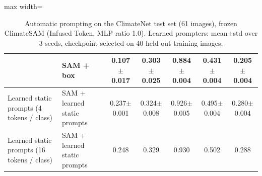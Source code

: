 \begin{table}[htbp]
\begin{adjustbox}{max width=\linewidth}
\begin{tabular}{llccccc}
 & SAM + box & 0.107$\pm$0.017 & 0.303$\pm$0.025 & 0.884$\pm$0.004 & 0.431$\pm$0.004 & 0.205$\pm$0.004 \\
\midrule
Learned static prompts (4 tokens / class) & SAM + learned static prompts & 0.237$\pm$0.001 & 0.324$\pm$0.008 & 0.926$\pm$0.005 & 0.495$\pm$0.004 & 0.280$\pm$0.004 \\
\midrule
Learned static prompts (16 tokens / class) & SAM + learned static prompts & 0.248 & 0.329 & 0.930 & 0.502 & 0.288 \\
\bottomrule
\end{tabular}
\end{adjustbox}
\caption{Automatic prompting on the ClimateNet test set (61 images), frozen ClimateSAM (Infused Token, MLP ratio 1.0). Learned prompters: mean$\pm$std over 3 seeds, checkpoint selected on 40 held-out training images.}
\label{tab:prompters_infused_mlp1}
\end{table}
